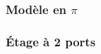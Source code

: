 \subsubsection{Modèle en $\pi$}
\begin{center}

\end{center}

\subsubsection{Étage à 2 ports}
\begin{center}

\end{center}